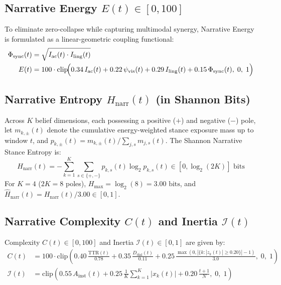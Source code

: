 \documentclass[10pt,letterpaper]{article}
\begin{document}
\subsection{Narrative Energy \texorpdfstring{$E(t) \in [0, 100]$}{E(t)}}
To eliminate zero-collapse while capturing multimodal synergy, Narrative Energy is formulated as a linear-geometric coupling functional:
\begin{align}
  \Phi_{\mathrm{sync}}(t) &= \sqrt{I_{\mathrm{ac}}(t) \cdot I_{\mathrm{ling}}(t)} \\
  E(t) &= 100 \cdot \mathrm{clip}\!\Bigl(0.34\,I_{\mathrm{ac}}(t) + 0.22\,\psi_{\mathrm{vis}}(t) + 0.29\,I_{\mathrm{ling}}(t) + 0.15\,\Phi_{\mathrm{sync}}(t),\; 0,\; 1\Bigr)
\end{align}

\subsection{Narrative Entropy \texorpdfstring{$H_{\mathrm{narr}}(t)$}{H\_narr(t)} (in Shannon Bits)}
Across $K$ belief dimensions, each possessing a positive ($+$) and negative ($-$) pole, let $m_{k,\pm}(t)$ denote the cumulative energy-weighted stance exposure mass up to window $t$, and $p_{k,\pm}(t) = m_{k,\pm}(t) / \sum_{j,s} m_{j,s}(t)$. The Shannon Narrative Stance Entropy \cite{Shannon1948} is:
\begin{equation}
  H_{\mathrm{narr}}(t) = -\sum_{k=1}^{K} \sum_{s \in \{+,-\}} p_{k,s}(t) \log_2 p_{k,s}(t) \in [0, \log_2(2K)]\text{ bits}
\end{equation}
For $K=4$ ($2K = 8$ poles), $H_{\max} = \log_2(8) = 3.00\text{ bits}$, and $\hat{H}_{\mathrm{narr}}(t) = H_{\mathrm{narr}}(t)/3.00 \in [0, 1]$.

\subsection{Narrative Complexity \texorpdfstring{$C(t)$}{C(t)} and Inertia \texorpdfstring{$\mathcal{I}(t)$}{I(t)}}
Complexity $C(t) \in [0, 100]$ and Inertia $\mathcal{I}(t) \in [0, 1]$ are given by:
\begin{align}
  C(t) &= 100 \cdot \mathrm{clip}\!\left(0.40\,\frac{\mathrm{TTR}(t)}{0.78} + 0.35\,\frac{D_{\mathrm{dial}}(t)}{0.11} + 0.25\,\frac{\max(0, |\{k : |z_k(t)| \ge 0.20\}| - 1)}{3.0},\; 0,\; 1\right) \\
  \mathcal{I}(t) &= \mathrm{clip}\!\left(0.55\,A_{\mathrm{inst}}(t) + 0.25\,\frac{1}{K}\sum_{k=1}^{K} |x_k(t)| + 0.20\,\frac{t+1}{N},\; 0,\; 1\right)
\end{align}
\end{document}

